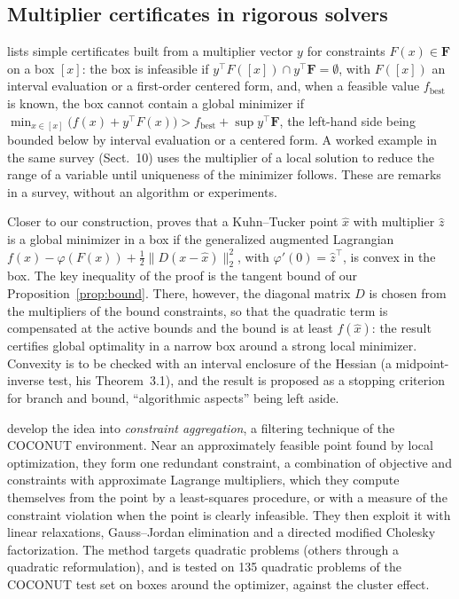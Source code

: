 \documentclass[11pt]{article}
\begin{document}
\subsection{Multiplier certificates in rigorous solvers}\label{sec:certif}

\citet[Sect.~20]{Neumaier2004} lists simple certificates built from a multiplier
vector $y$ for constraints $F(x) \in \mathbf F$ on a box $[x]$: the box is infeasible if
$y^\top F([x]) \cap y^\top \mathbf F = \emptyset$, with $F([x])$ an interval evaluation
or a first-order centered form, and, when a feasible value $f_{\text{best}}$ is known,
the box cannot contain a global minimizer if
$\min_{x \in [x]} \big(f(x) + y^\top F(x)\big) > f_{\text{best}} + \sup y^\top \mathbf F$,
the left-hand side being bounded below by interval evaluation or a centered form. A
worked example in the same survey (Sect.~10) uses the multiplier of a local solution to
reduce the range of a variable until uniqueness of the minimizer follows. These are
remarks in a survey, without an algorithm or experiments.

Closer to our construction, \citet{Neumaier1996} proves that a Kuhn--Tucker point
$\hat x$ with multiplier $\hat z$ is a global minimizer in a box if the generalized
augmented Lagrangian $f(x) - \varphi(F(x)) + \frac12 \|D(x - \hat x)\|_2^2$, with
$\varphi'(0) = \hat z^\top$, is convex in the box. The key inequality of the proof is
the tangent bound of our Proposition~\ref{prop:bound}. There, however, the diagonal
matrix $D$ is chosen from the multipliers of the bound constraints, so that the
quadratic term is compensated at the active bounds and the bound is at least
$f(\hat x)$: the result certifies global optimality in a narrow box around a strong
local minimizer. Convexity is to be checked with an interval enclosure of the Hessian
(a midpoint-inverse test, his Theorem~3.1), and the result is proposed as a stopping
criterion for branch and bound, ``algorithmic aspects'' being left aside.

\citet{DomesNeumaier2016} develop the idea into \emph{constraint aggregation}, a
filtering technique of the COCONUT environment. Near an approximately feasible point
found by local optimization, they form one redundant constraint, a combination of
objective and constraints with approximate Lagrange multipliers, which they compute
themselves from the point by a least-squares procedure, or with a measure of the
constraint violation when the point is clearly infeasible. They then exploit it with
linear relaxations, Gauss--Jordan elimination and a directed modified Cholesky
factorization. The method targets quadratic problems (others through a quadratic
reformulation), and is tested on 135 quadratic problems of the COCONUT test set on
boxes around the optimizer, against the cluster effect.
\end{document}
